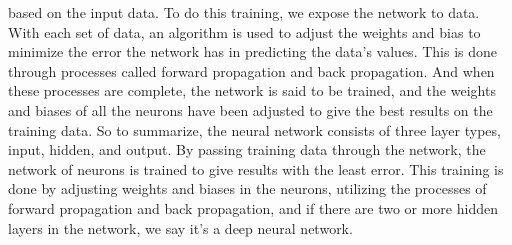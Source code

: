 based on the input data. To do this training, we expose the network to data.
With each set of data, an algorithm is used to adjust the weights and bias to
minimize the error the network has in predicting the data's values.
This is done through processes called forward propagation and back propagation.
And when these processes are complete, the network is said to be trained, and
the weights and biases of all the neurons have been adjusted to give the best
results on the training data. So to summarize, the neural network consists of
three layer types, input, hidden, and output. 
By passing training data through the network, the network of neurons is 
trained to give results with the least error.
This training is done by adjusting weights and biases in the neurons, utilizing
the processes of forward propagation and back propagation, and if there are two
or more hidden layers in the network, we say it's a deep neural network.
